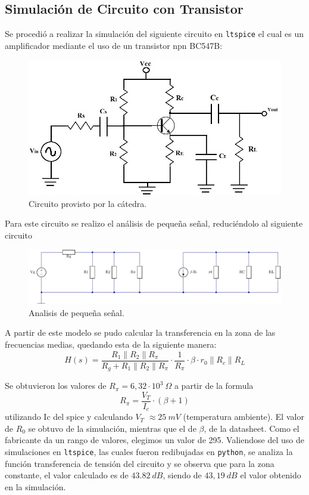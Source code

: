 \documentclass[a4paper]{article}
\begin{document}
\subsection*{Simulación de Circuito con Transistor}

Se procedió a realizar la simulación del siguiente circuito en \texttt{ltspice} el cual es un amplificador mediante el uso de un transistor npn BC547B:
\begin{figure}[H]
	\centering
	\includegraphics[width=0.6 \textwidth]{commonEmitter.jpg}	
	\caption{Circuito provisto por la cátedra.}
	\label{fig:cmnemitnpn}

\end{figure}

Para este circuito se realizo el análisis de pequeña señal, reduciéndolo al siguiente circuito
\begin{figure}[H]
	\centering
	\includegraphics[width=1 \textwidth]{CircEq.PNG}	
	\caption{Analisis de pequeña señal.}
	\label{fig:littleSignal}
\end{figure}

A partir de este modelo se pudo calcular la transferencia en la zona de las frecuencias medias, quedando esta de la siguiente manera: \[H(s)=\frac{R_1\parallel R_2\parallel R_\pi}{R_g+R_1\parallel R_2\parallel R_\pi}\cdot \frac{1}{R_\pi} \cdot \beta \cdot r_0 \parallel R_c \parallel R_L  \]

Se obtuvieron los valores de $R_\pi = 6,32 \cdot 10^{3} \ \Omega$ a partir de la formula \[R_\pi = \frac{V_T}{I_c}\cdot (\beta +1) \] utilizando Ic del spice y calculando $V_T$ $\approx 25 \ mV$ (temperatura ambiente).
El valor de $R_0$ se obtuvo de la simulación, mientras que el de $\beta$, de la datasheet. Como el fabricante da un rango de valores, elegimos un valor de 295.
Valiendose del uso de simulaciones en \texttt{ltspice}, las cuales fueron redibujadas en \texttt{python}, se analiza la función transferencia de tensión del circuito y se observa que para la zona constante, el valor calculado es de $43.82 \ dB$, siendo de $43,19 \ dB$ el valor obtenido en la simulación.
\end{document}
